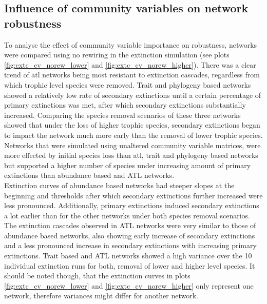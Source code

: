 \documentclass[12pt,a4paper]{article}
\begin{document}
\subsection{Influence of community variables on network robustness}

To analyse the effect of community variable importance on robustness, networks were compared using no rewiring in the extinction simulation (see plots \ref{fig:extc_cv_norew_lower} and \ref{fig:extc_cv_norew_higher}). There was a clear trend of atl networks being most resistant to extinction cascades, regardless from which trophic level species were removed. Trait and phylogeny based networks showed a relatively low rate of secondary extinctions until a certain percentage of primary extinctions was met, after which secondary extinctions substantially increased. Comparing the species removal scenarios of these three networks showed that under the loss of higher trophic species, secondary extinctions began to impact the network much more early than the removal of lower trophic species. Networks that were simulated using unaltered community variable matrices, were more effected by initial species loss than atl, trait and phylogeny based networks but supported a higher number of species under increasing amount of primary extinctions than abundance based and ATL networks.\\
Extinction curves of abundance based networks had steeper slopes at the beginning and thresholds after which secondary extinctions further increased were less pronounced. Additionally, primary extinctions induced secondary extinctions a lot earlier than for the other networks under both species removal scenarios. The extinction cascades observed in ATL networks were very similar to those of abundance based networks, also showing early increase of secondary extinctions and a less pronounced increase in secondary extinctions with increasing primary extinctions. Trait based and ATL networks showed a high variance over the 10 individual extinction runs for both, removal of lower and higher level species. It should be noted though, that the extinction curves in plots \ref{fig:extc_cv_norew_lower} and \ref{fig:extc_cv_norew_higher} only represent one network, therefore variances might differ for another network.

\end{document}
